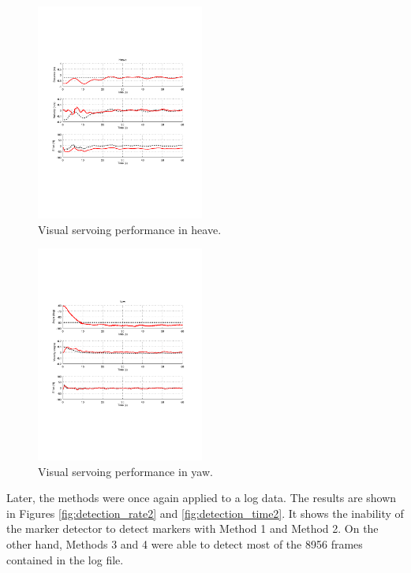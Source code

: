 \documentclass[conference, letterpaper]{IEEEtran}
\begin{document}
\begin{figure}[!ht]
	\centering
    \includegraphics[width=0.49\textwidth, trim={1.6cm 6.9cm 2.3cm 6.7cm}]{./fig/vs_heave_emb.pdf}
    \caption{Visual servoing performance in heave.}
	\label{fig:vs_heave}
\end{figure}

\begin{figure}[!ht]
	\centering
    \includegraphics[width=0.49\textwidth, trim={1.6cm 6.9cm 2.3cm 6.7cm}]{./fig/vs_yaw_emb.pdf}
    \caption{Visual servoing performance in yaw.}
	\label{fig:vs_yaw}
\end{figure}

Later, the methods were once again applied to a log data. The results are shown
in Figures \ref{fig:detection_rate2} and \ref{fig:detection_time2}. It shows
the inability of the marker detector to detect markers with Method 1 and
Method 2. On the other hand, Methods 3 and 4 were able to detect most of the
8956 frames contained in the log file. 
\end{document}
